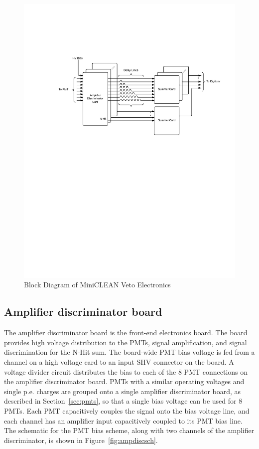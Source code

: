 \documentclass[review,number,sort&compress]{elsarticle}
\begin{document}
\begin{figure}[ht]
\begin{center}
\includegraphics[width=5in, keepaspectratio=true, trim=1.25in 5.75in 0.5in 2in, clip=true]{graphics/block.pdf}
\caption{Block Diagram of MiniCLEAN Veto Electronics
\label{fig:block_diagram}}
\end{center}
\end{figure}

\subsection{Amplifier discriminator board}
\label{sec:Amp-Disc}
%
The amplifier discriminator board is the front-end electronics board.
The board provides high voltage distribution to the PMTs, signal
amplification, and signal discrimination for the N-Hit sum. The
board-wide PMT bias voltage is fed from a channel on a high voltage card
to an input SHV connector on the board. A voltage divider circuit distributes the bias to
each of the 8 PMT connections on the amplifier discriminator board.
PMTs with a similar operating voltages and single p.e. charges are
grouped onto a single amplifier discriminator board, as described in
Section~\ref{sec:pmts}, so that a single bias voltage can be used for
8 PMTs. Each PMT capacitively couples the signal onto the bias voltage
line, and each channel has an amplifier input capacitively coupled to
its PMT bias line. The schematic for the PMT bias scheme, along with
two channels of the amplifier discriminator, is shown in
Figure~\ref{fig:ampdiscsch}.
\end{document}
